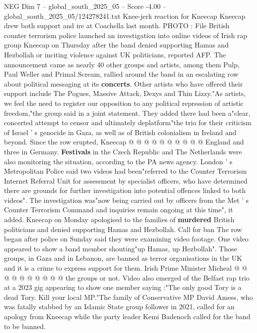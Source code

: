 \begin{textsample}{NEG Dim 7 – global\_south\_2025\_05 – Score -4.00 – global\_south\_2025\_05/124278241.txt}  \label{ex:f7_neg_219}
Knee-jerk reaction for Kneecap Kneecap drew both support and ire at Coachella last month.
PHOTO : File British counter terrorism police launched an investigation into online videos of Irish rap group Kneecap on Thursday after the band denied supporting Hamas and Hezbollah or inciting violence against UK politicians, reported AFP.
The announcement came as nearly 40 other groups and artists, among them Pulp, Paul Weller and Primal Scream, rallied around the band in an escalating row about political messaging at its \textbf{concerts}.
Other artists who have offered their support include The Pogues, Massive Attack, Dexys and Thin Lizzy."As artists, we feel the need to register our opposition to any political repression of artistic freedom,"the group said in a joint statement.
They added there had been a"clear, concerted attempt to censor and ultimately deplatform"the trio for their criticism of Israel ' s genocide in Gaza, as well as of British colonialism in Ireland and beyond.
Since the row erupted, Kneecap @ @ @ @ @ @ @ @ @ @ England and three in Germany. \textbf{Festivals} in the Czech Republic and The Netherlands were also monitoring the situation, according to the PA news agency.
London ' s Metropolitan Police said two videos had been"referred to the Counter Terrorism Internet Referral Unit for assessment by specialist officers, who have determined there are grounds for further investigation into potential offences linked to both videos".
The investigation was"now being carried out by officers from the Met ' s Counter Terrorism Command and inquiries remain ongoing at this time", it added.
Kneecap on Monday apologised to the families of \textbf{murdered} British politicians and denied supporting Hamas and Hezbollah.
Call for ban The row began after police on Sunday said they were examining video footage.
One video appeared to show a band member shouting"up Hamas, up Hezbollah".
Those groups, in Gaza and in Lebanon, are banned as terror organisations in the UK and it is a crime to express support for them.
Irish Prime Minister Micheal @ @ @ @ @ @ @ @ @ @ the groups or not.
Video also emerged of the Belfast rap trio at a 2023 gig appearing to show one member saying :"The only good Tory is a dead Tory.
Kill your local MP."The family of Conservative MP David Amess, who was fatally stabbed by an Islamic State group follower in 2021, called for an apology from Kneecap while the party leader Kemi Badenoch called for the band to be banned.

\end{textsample}
